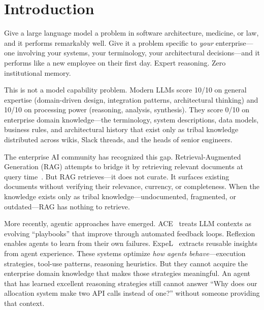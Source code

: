 \documentclass[11pt,a4paper]{article}
\begin{document}
\section{Introduction}
\label{sec:introduction}

%

Give a large language model a problem in software architecture, medicine, or law, and it performs remarkably well. Give it a problem specific to \emph{your} enterprise---one involving your systems, your terminology, your architectural decisions---and it performs like a new employee on their first day. Expert reasoning. Zero institutional memory.

This is not a model capability problem. Modern LLMs score 10/10 on general expertise (domain-driven design, integration patterns, architectural thinking) and 10/10 on processing power (reasoning, analysis, synthesis). They score 0/10 on enterprise domain knowledge---the terminology, system descriptions, data models, business rules, and architectural history that exist only as tribal knowledge distributed across wikis, Slack threads, and the heads of senior engineers.

The enterprise AI community has recognized this gap. Retrieval-Augmented Generation (RAG) attempts to bridge it by retrieving relevant documents at query time~\citep{lewis2020rag}. But RAG retrieves---it does not curate. It surfaces existing documents without verifying their relevance, currency, or completeness. When the knowledge exists only as tribal knowledge---undocumented, fragmented, or outdated---RAG has nothing to retrieve.

More recently, agentic approaches have emerged. ACE~\citep{zhang2025ace} treats LLM contexts as evolving ``playbooks'' that improve through automated feedback loops. Reflexion~\citep{shinn2023reflexion} enables agents to learn from their own failures. ExpeL~\citep{zhao2023expel} extracts reusable insights from agent experience. These systems optimize \emph{how agents behave}---execution strategies, tool-use patterns, reasoning heuristics. But they cannot acquire the enterprise domain knowledge that makes those strategies meaningful. An agent that has learned excellent reasoning strategies still cannot answer ``Why does our allocation system make two API calls instead of one?'' without someone providing that context.
\end{document}
